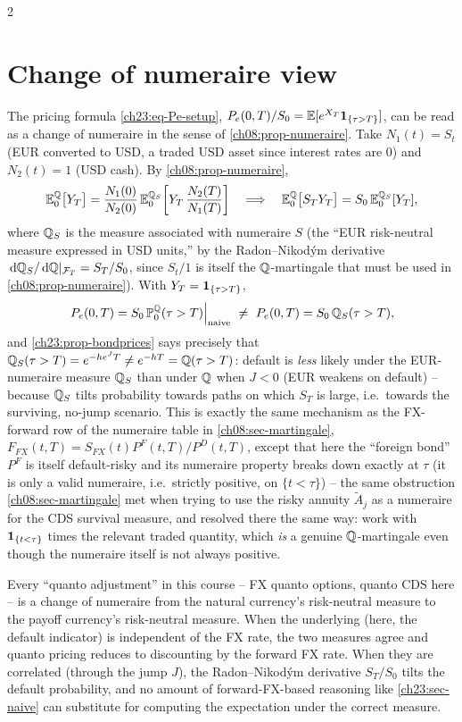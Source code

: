 \begin{paracol}{2}
\section{Change of numeraire view}\label{ch23:sec-numeraire}
The pricing formula \eqref{ch23:eq-Pe-setup}, $P_e(0,T)/S_0=\mathbb{E}[e^{X_T}\mathbf{1}_{\{\tau>T\}}]$, can be read as a change
of numeraire in the sense of \cref{ch08:prop-numeraire}. Take $N_1(t)=S_t$ (EUR converted to USD, a traded USD
asset since interest rates are $0$) and $N_2(t)=1$ (USD cash). By \cref{ch08:prop-numeraire},
\[
  \mathbb{E}_0^{\mathbb{Q}}\bigl[Y_T\bigr]=\frac{N_1(0)}{N_2(0)}\,\mathbb{E}_0^{\mathbb{Q}_{S}}\!\left[Y_T\,\frac{N_2(T)}{N_1(T)}\right]
  \quad\Longrightarrow\quad
  \mathbb{E}_0^{\mathbb{Q}}\bigl[S_TY_T\bigr]=S_0\,\mathbb{E}_0^{\mathbb{Q}_S}[Y_T],
\]
where $\mathbb{Q}_S$ is the measure associated with numeraire $S$ (the ``EUR risk-neutral measure expressed in USD units,''
by the Radon--Nikod\'ym derivative $\,\mathrm{d}\mathbb{Q}_S/\,\mathrm{d}\mathbb{Q}|_{\mathcal F_T}=S_T/S_0$, since $S_t/1$ is itself the
$\mathbb{Q}$-martingale that must be used in \cref{ch08:prop-numeraire}). With $Y_T=\mathbf{1}_{\{\tau>T\}}$,
\begin{equation}\label{ch23:eq-numeraire-view}
  P_e(0,T)=S_0\,\Prob_0^{\Q}(\tau>T)\Big|_{\text{naive}}\ \ne\ P_e(0,T)=S_0\,\Q_S(\tau>T),
\end{equation}
and \cref{ch23:prop-bondprices} says precisely that $\mathbb{Q}_S(\tau>T)=e^{-he^JT}\ne e^{-hT}=\mathbb{Q}(\tau>T)$: default is
\emph{less} likely under the EUR-numeraire measure $\mathbb{Q}_S$ than under $\mathbb{Q}$ when $J<0$ (EUR weakens on default) --
because $\mathbb{Q}_S$ tilts probability towards paths on which $S_T$ is large, i.e.\ towards the surviving, no-jump
scenario. This is exactly the same mechanism as the FX-forward row of the numeraire table in
\cref{ch08:sec-martingale}, $F_{FX}(t,T)=S_{FX}(t)P^F(t,T)/P^D(t,T)$, except that here the ``foreign bond'' $P^F$ is
itself default-risky and its numeraire property breaks down exactly at $\tau$ (it is only a valid numeraire, i.e.\
strictly positive, on $\{t<\tau\}$) -- the same obstruction \cref{ch08:sec-martingale} met when trying to use the
risky annuity $\tilde A_j$ as a numeraire for the CDS survival measure, and resolved there the same way: work with
$\mathbf{1}_{\{t<\tau\}}$ times the relevant traded quantity, which \emph{is} a genuine $\mathbb{Q}$-martingale even though the
numeraire itself is not always positive.

\begin{intuition}[Quanto adjustment = change of measure]
Every ``quanto adjustment'' in this course -- FX quanto options, quanto CDS here -- is a change of numeraire from
the natural currency's risk-neutral measure to the payoff currency's risk-neutral measure. When the underlying
(here, the default indicator) is independent of the FX rate, the two measures agree and quanto pricing reduces to
discounting by the forward FX rate. When they are correlated (through the jump $J$), the Radon--Nikod\'ym
derivative $S_T/S_0$ tilts the default probability, and no amount of forward-FX-based reasoning like
\cref{ch23:sec-naive} can substitute for computing the expectation under the correct measure.
\end{intuition}


\end{paracol}
